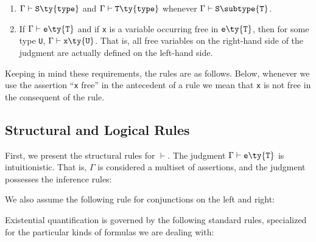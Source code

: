 {\begin{enumerate}
\item
    $\Gamma \vdash {\tt S} \ty {\tt type}$ and
    $\Gamma \vdash {\tt T} \ty {\tt type}$ whenever
      $\Gamma \vdash {\tt S} \subtype {\tt T}$.

\item
If 
      $\Gamma \vdash {\tt e} \ty {\tt T}$ and if {\tt x}
is a variable occurring free in ${\tt e} \ty {\tt T}$, then for some
      type {\tt U},
      $\Gamma \vdash {\tt x} \ty {\tt U}$.
That is, all free variables on the right-hand
      side of the judgment are actually defined on the left-hand side.
\end{enumerate}


Keeping in mind these requirements, the rules are as follows. Below,
whenever we use the assertion ``{\tt x} free'' in the antecedent of
a rule we mean
that {\tt x} is not free in the consequent of the rule.


\subsection{
      Structural and Logical Rules
}


First, we present the structural rules for $\vdash$. The
judgment
$\Gamma\vdash {\tt e} \ty {\tt T}$ is
intuitionistic. That is, $\Gamma$ is considered a multiset of assertions, and
the judgment possesses the inference rules:






We also assume the following rule for conjunctions on the left and right:






Existential quantification is governed by the following standard rules,
specialized for the particular kinds of formulas we are dealing with:







}

